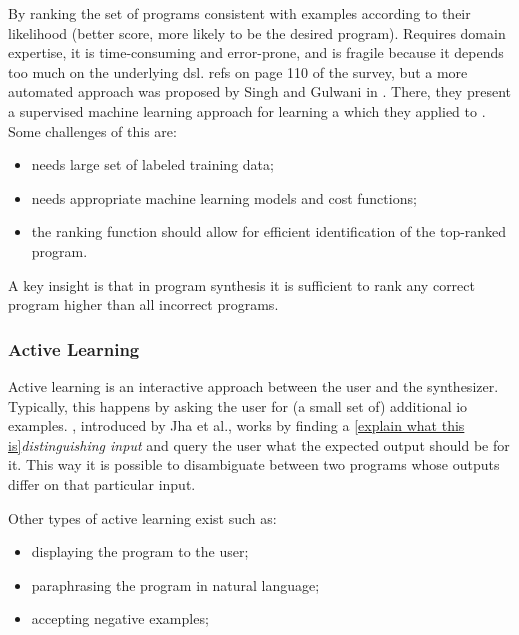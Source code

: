  By ranking the set of programs
consistent with examples according to their likelihood (better score, more
likely to be the desired program). Requires domain expertise, it is
time-consuming and error-prone, and is fragile because it depends too much on
the underlying \gls{dsl}.  {refs on page 110 of the survey},
but a more automated approach was proposed by Singh and Gulwani in
\cite{Singh:ranking:2015}. There, they present a supervised machine learning
approach for learning a  which
they applied to . Some challenges of this are:
\begin{itemize}
\item needs large set of labeled training data;
\item needs appropriate machine learning models and cost functions;
\item the ranking function should allow for efficient identification of the
  top-ranked program.
\end{itemize}

 A key insight is that in program synthesis it
is sufficient to rank any correct program higher than all incorrect programs.

\subsubsection{Active Learning}

Active learning is an interactive approach between the user and the synthesizer.
Typically, this happens by asking the user for (a small set of) additional
\gls{io} examples. ,
introduced by Jha et al.\cite{Jha:oracle:2010}, works by finding a \ref{explain
what this is}\textit{distinguishing input} and query the user what the expected
output should be for it. This way it is possible to disambiguate between two
programs whose outputs differ on that particular input.

Other types of active learning exist such as:
\begin{itemize}
\item displaying the program to the user;
\item paraphrasing the program in natural language;
\item accepting negative examples; 
\end{itemize}


